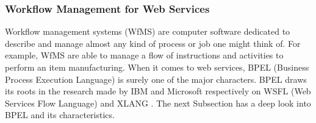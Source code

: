 \subsubsection{Workflow Management for Web Services}
Workflow management systems (WfMS) are computer software dedicated to describe and manage almost any kind of process or job one might think of. For example, WfMS are able to manage a flow of instructions and activities to perform an item manufacturing. When it comes to web services, BPEL (Business Process Execution Language) is surely one of the major characters. BPEL draws its roots in the research made by IBM and Microsoft respectively on WSFL (Web Services Flow Language) and XLANG \cite{Havey2005}. The next Subsection has a deep look into BPEL and its characteristics.

